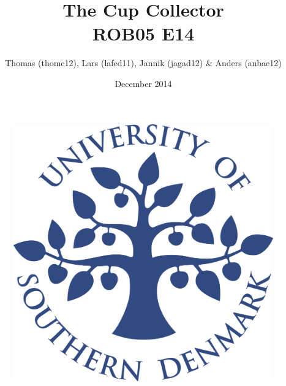 \title{The Cup Collector \\ ROB05 E14}
\author{Thomas (thomc12), Lars (lafed11), Jannik (jagad12) \& Anders (anbae12)}
\date{December 2014}
\begin{figure}
\centering
\includegraphics[width=1\textwidth]{graphics/forside.png}
\end{figure}
\maketitle
